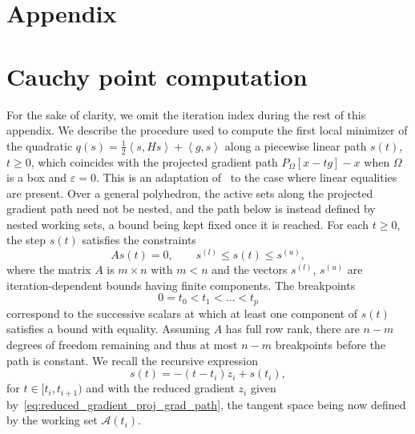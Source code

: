 \documentclass{article}
\numberwithin{equation}{section}
\newcommand{\calA}{{\mathcal{A}}}
\newcommand{\inner}[2]{\left\langle {#1} , {#2} \right\rangle} %
\newcommand{\proj}[2]{P_{#1} \left[ {#2} \right]} %
\theoremstyle{plain}
\begin{document}
	\section*{Appendix}
	
	\appendix
	
	
	\section{Cauchy point computation}\label{appendix:cauchy_point_computation}

For the sake of clarity, we omit the iteration index during the rest of this appendix. 
We describe the procedure used to compute the first local minimizer of the quadratic $q(s) = \frac{1}{2} \inner{s}{Hs} + \inner{g}{s}$ along a piecewise linear path $s(t)$, $t \ge 0$, which coincides with the projected gradient path $\proj{\Omega}{x-tg}-x$ when $\Omega$ is a box and $\varepsilon = 0$. This is an adaptation of~\cite[Algorithm~17.3.1]{conn-etal:2000} to the case where linear equalities are present. Over a general polyhedron, the active sets along the projected gradient path need not be nested, and the path below is instead defined by nested working sets, a bound being kept fixed once it is reached.
For each $t \ge 0$, the step $s(t)$ satisfies the constraints
\[As(t) = 0, \qquad s^{(l)} \le s(t) \le s^{(u)},\]
where the matrix $A$ is $m\times n$ with $m < n$ and the vectors $s^{(l)}$, $s^{(u)}$ are iteration-dependent bounds having finite components.
The breakpoints
\begin{equation*}
	0=t_0 < t_1 < \ldots < t_p
\end{equation*} 
correspond to the successive scalars at which at least one component of $s(t)$ satisfies a bound with equality. Assuming $A$ has full row rank, there are $n-m$ degrees of freedom remaining and thus at most $n-m$ breakpoints before the path is constant. We recall the recursive expression
\[s(t) = -(t-t_i)z_i + s(t_i),\]
for $t\in [t_i, t_{i+1})$ and with the reduced gradient $z_i$ given by~\eqref{eq:reduced_gradient_proj_grad_path}, the tangent space being now defined by the working set $\calA(t_i)$.
\end{document}
